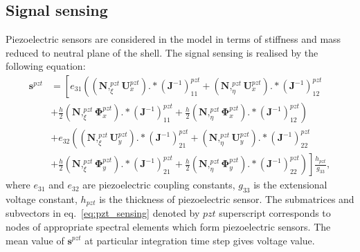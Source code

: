 \documentclass[preprint,12pt]{elsarticle}
\renewcommand{\vec}[1]{\mathbf{#1}}
\renewcommand{\bm}[1]{\mathbf{#1}}
\newcommand{\bs}[1]{\boldsymbol{#1}}
\begin{document}
	\subsection{Signal sensing}
	Piezoelectric sensors are considered in the model in terms of stiffness and mass reduced to neutral plane of the shell. The signal sensing is realised by the following equation:
	\begin{equation}
	\begin{split}
	\vec{s}^{pzt} &= \left[ e_{31}\left((\bm{N},_{\xi}^{pzt}\vec{U}_x^{pzt}).*(\vec{J}^{-1})_{11}^{pzt} + (\bm{N},_{\eta}^{pzt}\vec{U}_x^{pzt}).*(\vec{J}^{-1})_{12}^{pzt} \right.\right.\\
	&+ \frac{h}{2} (\bm{N},_{\xi}^{pzt}\bs{\Phi}_x^{pzt}).*(\vec{J}^{-1})_{11}^{pzt} + \frac{h}{2} \left.(\bm{N},_{\eta}^{pzt}\bs{\Phi}_x^{pzt}).*(\vec{J}^{-1})_{12}^{pzt}\right)\\
	&+ e_{32}\left((\bm{N},_{\xi}^{pzt}\vec{U}_y^{pzt}).*(\vec{J}^{-1})_{21}^{pzt} + (\bm{N},_{\eta}^{pzt}\vec{U}_y^{pzt}).*(\vec{J}^{-1})_{22}^{pzt} \right.\\
	&+ \frac{h}{2} (\bm{N},_{\xi}^{pzt}\bs{\Phi}_y^{pzt}).*(\vec{J}^{-1})_{21}^{pzt} + \frac{h}{2} \left.\left.(\bm{N},_{\eta}^{pzt}\bs{\Phi}_y^{pzt}).*(\vec{J}^{-1})_{22}^{pzt}\right)\right] \frac{h_{pzt}}{g_{33}}, 
	\end{split}
	\label{eq:pzt_sensing}
	\end{equation}
	where $e_{31}$ and $e_{32}$ are piezoelectric coupling constants, $g_{33}$ is the extensional voltage constant, $h_{pzt}$ is the thickness of piezoelectric sensor. The submatrices and subvectors in eq.~\ref{eq:pzt_sensing} denoted by $pzt$ superscript corresponds to nodes of appropriate spectral elements which form piezoelectric sensors. The mean value of $\vec{s}^{pzt}$ at particular integration time step gives voltage value. 
\end{document}
